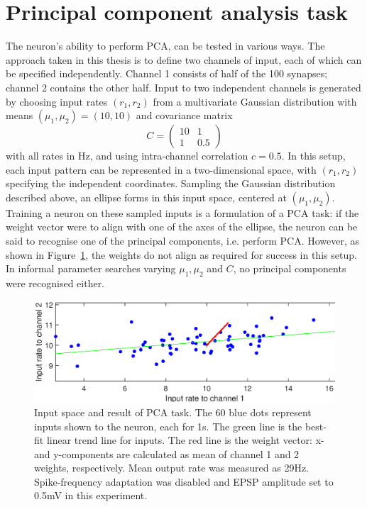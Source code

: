 \documentclass[a4paper,12pt]{report}
\theoremstyle{definition}
\begin{document}
\section{Principal component analysis task} %
\label{sec:pca}
The neuron's ability to perform PCA, can be tested in various ways. The approach taken in this thesis is to define two channels of input, each of which can be specified independently. Channel 1 consists of half of the 100 synapses; channel 2 contains the other half. Input to two independent channels is generated by choosing input rates $(r_1, r_2)$ from a multivariate Gaussian distribution with means $(\mu_1, \mu_2)=(10,10)$ and covariance matrix
$$
C =
\begin{pmatrix}
  10 & 1 \\
  1 & 0.5
 \end{pmatrix}
$$
with all rates in Hz, and using intra-channel correlation $c=0.5$. In this setup, each input pattern can be represented in a two-dimensional space, with $(r_1, r_2)$ specifying the independent coordinates. Sampling the Gaussian distribution described above, an ellipse forms in this input space, centered at $(\mu_1, \mu_2)$. Training a neuron on these sampled inputs is a formulation of a PCA task: if the weight vector were to align with one of the axes of the ellipse, the neuron can be said to recognise one of the principal components, i.e. perform PCA. However, as shown in Figure~\ref{fig:exp10_pca}, the weights do not align as required for success in this setup. In informal parameter searches varying $\mu_1, \mu_2$ and $C$, no principal components were recognised either.

\begin{figure}[!htb]
    \centering
    \includegraphics[width=\textwidth]{figures/exp10_pca.eps}
    \caption{Input space and result of PCA task. The 60 blue dots represent inputs shown to the neuron, each for 1s. The green line is the best-fit linear trend line for inputs. The red line is the weight vector: x- and y-components are calculated as mean of channel 1 and 2 weights, respectively. Mean output rate was measured as 29Hz. Spike-frequency adaptation was disabled and EPSP amplitude set to 0.5mV in this experiment.}
    \label{fig:exp10_pca}
\end{figure}
\end{document}
